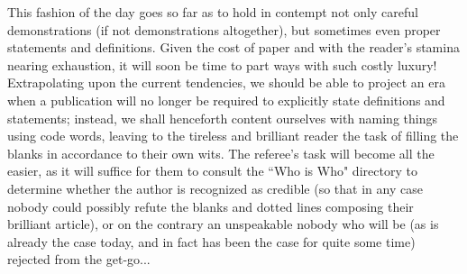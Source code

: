 This fashion of the day goes so far as to hold in contempt not only careful demonstrations (if not demonstrations altogether), but sometimes even proper statements and definitions. Given the cost of paper and with the reader's stamina nearing exhaustion, it will soon be time to part ways with such costly luxury! Extrapolating upon the current tendencies, we should be able to project an era when a publication will no longer be required to explicitly state definitions and statements; instead, we shall henceforth content ourselves with naming things using code words, leaving to the tireless and brilliant reader the task of filling the blanks in accordance to their own wits. The referee's task will become all the easier, as it will suffice for them to consult the ``Who is Who" directory to determine whether the author is recognized as credible (so that in any case nobody could possibly refute the blanks and dotted lines composing their brilliant article), or on the contrary an unspeakable nobody who will be (as is already the case today, and in fact has been the case for quite some time) rejected from the get-go...













% 
